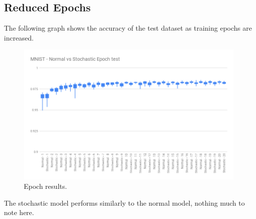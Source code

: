 \documentclass[a4paper,oneside,phd,etd]{BYUPhys}
\begin{document}
\vfill
\subsection{Reduced Epochs}
The following graph shows the accuracy of the test dataset as training epochs are increased.
\begin{figure}[H]
\centering
\includegraphics[width=16cm]{results/epoch.png}
\caption{Epoch results.}
\label{fig:epoch}
\end{figure}
The stochastic model performs similarly to the normal model, nothing much to note here.
\end{document}

